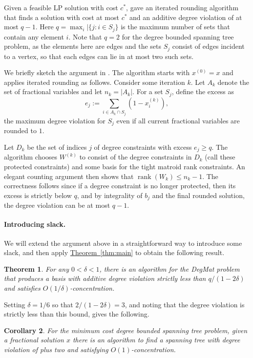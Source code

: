 \documentclass[11pt]{article}
\newcommand{\rank}{\operatorname{rank}}
\newtheorem{theorem}{Theorem}[section]
\newtheorem{corollary}[theorem]{Corollary}
\theoremstyle{definition}
\newcommand{\expref}[2]{\texorpdfstring{\hyperref[#2]{#1~\ref{#2}}}{#1~\ref{#2}}}
\begin{document}
Given a feasible LP solution with cost $c^*$,
\cite{KLS08,BKN09} gave an iterated rounding algorithm that finds a solution with cost at most $c^*$ and an additive degree violation of at most $q-1$.
Here $q = \max_i |\{j: i\in S_j\}$  is the maximum number of sets that contain any element $i$. Note that $q=2$ for
the degree bounded spanning tree problem, as the elements here are edges and the sets $S_j$ consist of edges incident to a vertex, so that each edges can lie in at most two such sets.

We briefly sketch the argument in \cite{KLS08,BKN09}. The algorithm starts with $x^{(0)}=x$ and applies iterated rounding as follows.
Consider some iteration $k$. Let $A_k$ denote the set of fractional variables and let $n_k=|A_k|$. For a set $S_j$, define the excess as
\begin{equation}
\label{eq:excess2} e_j:= \sum_{i \in A_k \cap S_j} (1-x^{(k)}_{i}),
\end{equation}
the maximum degree violation for $S_j$ even if all current fractional variables are rounded to $1$.

Let $D_k$ be the set of indices $j$ of degree constraints with excess $e_j \geq q$.
The algorithm chooses $W^{(k)}$ to consist of the degree constraints in $D_k$ (call these protected constraints) and some basis for the tight matroid rank constraints.
An elegant counting argument then shows that $\rank(W_k) \leq n_k-1$. The correctness follows since if a degree constraint is no longer protected, then its excess is strictly below $q$, and by integrality of $b_j$ and the final rounded solution, the degree violation can be at most $q-1$.

\paragraph{Introducing slack.} We will extend the argument above in a straightforward way to introduce some slack, and then apply \expref{Theorem}{thm:main} to obtain the following result.
\begin{theorem} For any $0 < \delta < 1$, there is  an algorithm for the DegMat problem that produces a basis with additive degree violation strictly less than $q/(1-2\delta)$ and satisfies $O(1/\delta)$-concentration.
\end{theorem}
Setting $\delta = 1/6$ so that $2/(1-2\delta) = 3$, and noting that the degree violation is strictly less than this bound, gives the following.
\begin{corollary}
For the minimum cost degree bounded spanning tree problem, given a fractional solution $x$ there is an algorithm to find a spanning tree with degree violation of plus two and satisfying $O(1)$-concentration.
\end{corollary}
\end{document}
